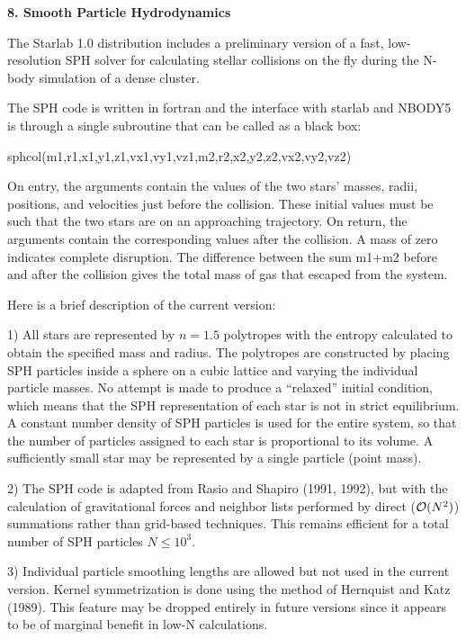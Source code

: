\null\bigskip
\centerline{\bf 8. Smooth Particle Hydrodynamics}
\medskip

The Starlab 1.0 distribution includes a preliminary version of a 
fast, low-resolution SPH solver for calculating stellar collisions 
on the fly during the N-body simulation of a dense cluster. 

The SPH code is written in fortran and the interface with starlab and
NBODY5 is through a single subroutine that can be called as a black box:

sphcol(m1,r1,x1,y1,z1,vx1,vy1,vz1,m2,r2,x2,y2,z2,vx2,vy2,vz2)

On entry, the arguments contain the values of the two stars' masses,
radii, positions, and velocities just before the collision. These
initial values must be such that the two stars are on an approaching
trajectory. On return, the arguments contain the corresponding values
after the collision. A mass of zero indicates complete disruption.
The difference between the sum m1+m2 before and after the collision gives
the total mass of gas that escaped from the system.

Here is a brief description of the current version:  

1) All stars are represented by $n=1.5$ polytropes with the entropy
calculated to obtain the specified mass and radius. The polytropes 
are constructed by placing SPH particles inside a sphere on a cubic 
lattice and varying the individual particle masses. No attempt is
made to produce a ``relaxed'' initial condition, which means that
the SPH representation of each star is not in strict equilibrium.
A constant number density of SPH particles is used for the entire
system, so that the number of particles assigned to each star is
proportional to its volume. A sufficiently small star may be
represented by a single particle (point mass).

2) The SPH code is adapted from Rasio and Shapiro (1991, 1992), but 
with the calculation of gravitational forces and neighbor lists 
performed by direct (${\cal O}(N^2)$) summations rather than 
grid-based techniques. This remains efficient for a total number of
SPH particles $N\le 10^3$.

3) Individual particle smoothing lengths are allowed but not used
in the current version. Kernel symmetrization is done using the
method of Hernquist and Katz (1989). This feature may be dropped entirely 
in future versions since it appears to be of marginal benefit in low-N 
calculations.

